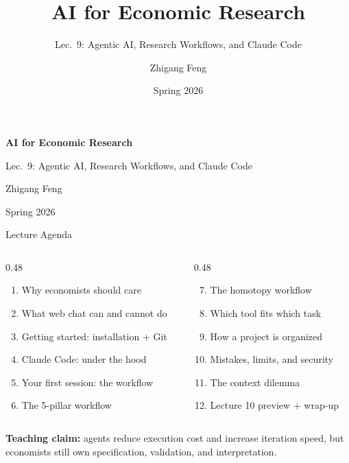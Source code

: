 \documentclass[10pt,english,aspectratio=169]{beamer}
\title[AI for Economic Research]{AI for Economic Research}
\subtitle{Lec.~9: Agentic AI, Research Workflows, and Claude Code}
\author{Zhigang Feng}
\date{Spring 2026}
\begin{document}
\begin{frame}[plain]
\begin{center}
\vspace{1.2cm}
{\Large\textbf{AI for Economic Research}\par}
\vspace{0.35cm}
{\large Lec.~9: Agentic AI, Research Workflows, and Claude Code\par}
\vspace{0.8cm}
{\normalsize Zhigang Feng\par}
\vspace{0.1cm}
{\normalsize Spring 2026\par}
\end{center}
\end{frame}


\begin{frame}{Lecture Agenda}
\begin{columns}[T]
\begin{column}{0.48\textwidth}
\begin{enumerate}
    \item Why economists should care
    \item What web chat can and cannot do
    \item Getting started: installation + Git
    \item Claude Code: under the hood
    \item Your first session: the workflow
    \item The 5-pillar workflow
\end{enumerate}
\end{column}
\begin{column}{0.48\textwidth}
\begin{enumerate}
    \setcounter{enumi}{6}
    \item The homotopy workflow
    \item Which tool fits which task
    \item How a project is organized
    \item Mistakes, limits, and security
    \item The context dilemma
    \item Lecture 10 preview + wrap-up
\end{enumerate}
\end{column}
\end{columns}

\vspace{0.3cm}

\textbf{Teaching claim:} agents reduce execution cost and increase iteration speed, but economists still own specification, validation, and interpretation.
\end{frame}
\end{document}
